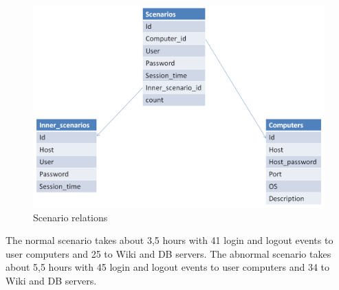 \begin{figure}[ht!]
\centering
\includegraphics[width=\textwidth]{scenario_relations.png}
\caption{Scenario relations}
\label{overflow}
\end{figure}


The normal scenario takes about 3,5 hours with 41 login and logout events to user computers and 25 to Wiki and DB servers. The abnormal scenario takes about 5,5 hours with 45 login and logout events to user computers and 34 to Wiki and DB servers.
 
% 